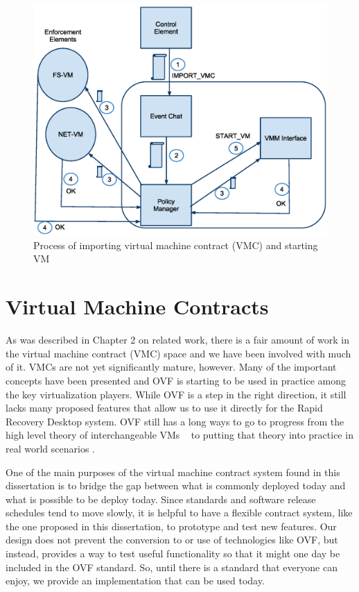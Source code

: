 \begin{figure}[tbp]
\begin{centering}
\caption{Process of importing virtual machine contract (VMC) and starting VM}
\label{fig:StartVM}
\includegraphics[scale=.7]{figs/StartVM}
\end{centering}
\end{figure}

\section{Virtual Machine Contracts}

As was described in Chapter 2 on related work, there is a fair amount of work in the virtual machine contract (VMC) space and we have been involved with much of it. VMCs are not yet significantly mature, however. Many of the important concepts have been presented \cite{virtual_machine_contract_ICAC09} and OVF is starting to be used in practice among the key virtualization players. While OVF is a step in the right direction, it still lacks many proposed features that allow us to use it directly for the Rapid Recovery Desktop system. OVF still has a long ways to go to progress from the high level theory of interchangeable VMs ~\cite{dmtf_newsletter, vmware_ovf_website, citrix_ovf_article, rhev_announce_2010} to putting that theory into practice in real world scenarios \cite {ovf_vmware_to_kvm_2010,fedora_virtAppliances, kensho_ovf_vmware_article}. 

One of the main purposes of the virtual machine contract system found in this dissertation is to bridge the gap between what is commonly deployed today and what is possible to be deploy today. Since standards and software release schedules tend to move slowly, it is helpful to have a flexible contract system, like the one proposed in this dissertation, to prototype and test new features. Our design does not prevent the conversion to or use of technologies like OVF, but instead, provides a way to test useful functionality so that it might one day be included in the OVF standard. So, until there is a standard that everyone can enjoy, we provide an implementation that can be used today. 

